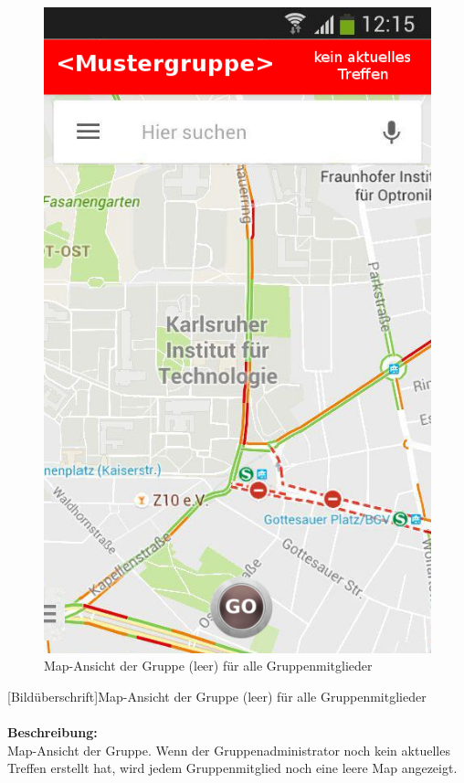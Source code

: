 \begin{figure} [H]
	\caption{Map-Ansicht der Gruppe (leer) für alle Gruppenmitglieder}
\begin{center}
	\includegraphics[scale =0.5]{resources/images/map_leer.png}
\end{center}
\end{figure}
[Bildüberschrift]Map-Ansicht der Gruppe (leer) für alle Gruppenmitglieder\\ \\
\textbf{Beschreibung:}\\
Map-Ansicht der Gruppe. Wenn der Gruppenadministrator noch kein aktuelles Treffen erstellt hat, wird jedem Gruppenmitglied noch eine leere Map angezeigt.\\
